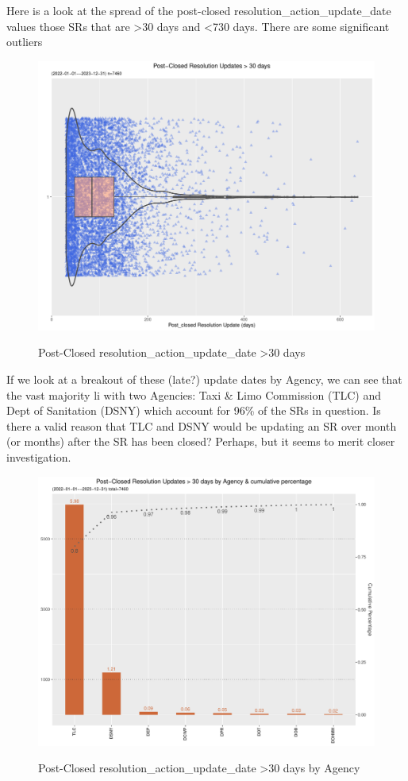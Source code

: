 \documentclass[12pt, titlepage]{article}
\begin{document}
{	Here is a look at the spread of the post-closed resolution\_action\_update\_date values those SRs 
	that are \textgreater{}30 days and \textless{}730 days. There are some significant outliers 
	
	\begin{figure}[tbp]
		 \centering
		 \caption{Post-Closed resolution\_action\_update\_date >30 days }
		 \includegraphics[width = \textwidth]{post_closed_violin.pdf}
		 \label{fig:resolution-violin}
	\end{figure}		

	If we look at a breakout of these (late?) update dates by Agency, we can see that the vast majority li with two
	Agencies: Taxi \& Limo Commission (TLC) and Dept of Sanitation (DSNY) which account for 96\% of the SRs in
	question.  Is there a valid reason that TLC and DSNY would be updating an SR over month (or months) after
	the SR has been closed? Perhaps, but it seems to merit closer investigation. 

	\begin{figure}[tbp]
		 \centering
		 \caption{Post-Closed resolution\_action\_update\_date >30 days by Agency }
		 \includegraphics[width = \textwidth]{postClosedBarChart.pdf}
		 \label{fig:resolution-by-agency}
	\end{figure}		

}
\end{document}
